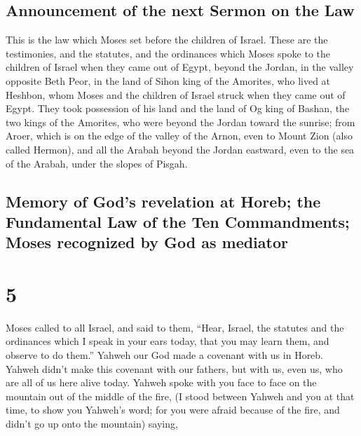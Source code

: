 \hypertarget{announcement-of-the-next-sermon-on-the-law}{%
\subsection{Announcement of the next Sermon on the
Law}\label{announcement-of-the-next-sermon-on-the-law}}

 This is the law which Moses set before the children of
Israel.  These are the testimonies, and the statutes, and
the ordinances which Moses spoke to the children of Israel when they
came out of Egypt,  beyond the Jordan, in the valley
opposite Beth Peor, in the land of Sihon king of the Amorites, who lived
at Heshbon, whom Moses and the children of Israel struck when they came
out of Egypt.  They took possession of his land and the
land of Og king of Bashan, the two kings of the Amorites, who were
beyond the Jordan toward the sunrise;  from Aroer, which
is on the edge of the valley of the Arnon, even to Mount Zion (also
called Hermon),  and all the Arabah beyond the Jordan
eastward, even to the sea of the Arabah, under the slopes of Pisgah.

\hypertarget{memory-of-gods-revelation-at-horeb-the-fundamental-law-of-the-ten-commandments-moses-recognized-by-god-as-mediator}{%
\subsection{Memory of God's revelation at Horeb; the Fundamental Law of
the Ten Commandments; Moses recognized by God as
mediator}\label{memory-of-gods-revelation-at-horeb-the-fundamental-law-of-the-ten-commandments-moses-recognized-by-god-as-mediator}}

\hypertarget{section-4}{%
\section{5}\label{section-4}}

 Moses called to all Israel, and said to them, ``Hear,
Israel, the statutes and the ordinances which I speak in your ears
today, that you may learn them, and observe to do them.'' 
Yahweh our God made a covenant with us in Horeb.  Yahweh
didn't make this covenant with our fathers, but with us, even us, who
are all of us here alive today.  Yahweh spoke with you
face to face on the mountain out of the middle of the fire,
 (I stood between Yahweh and you at that time, to show you
Yahweh's word; for you were afraid because of the fire, and didn't go up
onto the mountain) saying,

